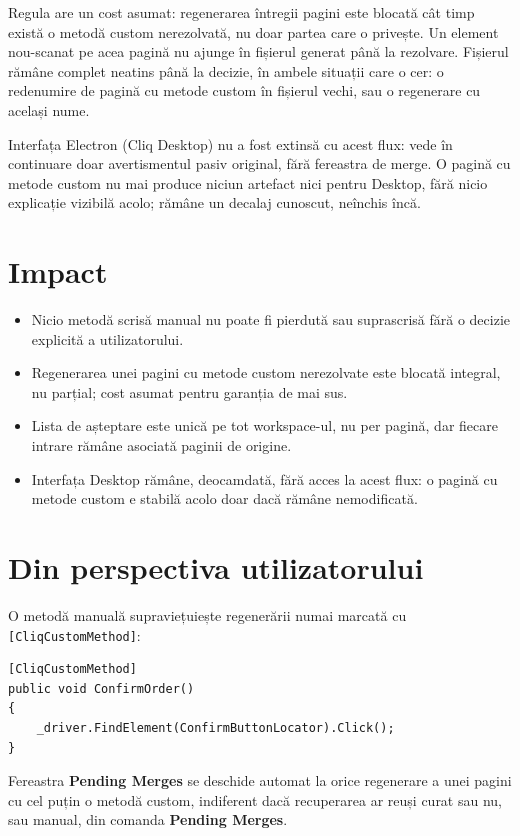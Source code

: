 \documentclass[12pt,a4paper]{report}
\newcommand{\UI}[1]{\textbf{#1}}
\newcommand{\File}[1]{\nolinkurl{#1}}
\begin{document}
Regula are un cost asumat: regenerarea întregii pagini este blocată cât timp există o metodă custom nerezolvată, nu doar partea care o privește. Un element nou-scanat pe acea pagină nu ajunge în fișierul generat până la rezolvare. Fișierul rămâne complet neatins până la decizie, în ambele situații care o cer: o redenumire de pagină cu metode custom în fișierul vechi, sau o regenerare cu același nume.

Interfața Electron (Cliq Desktop) nu a fost extinsă cu acest flux: vede în continuare doar avertismentul pasiv original, fără fereastra de merge. O pagină cu metode custom nu mai produce niciun artefact nici pentru Desktop, fără nicio explicație vizibilă acolo; rămâne un decalaj cunoscut, neînchis încă.

\section{Impact}

\begin{itemize}
  \item Nicio metodă scrisă manual nu poate fi pierdută sau suprascrisă fără o decizie explicită a utilizatorului.
  \item Regenerarea unei pagini cu metode custom nerezolvate este blocată integral, nu parțial; cost asumat pentru garanția de mai sus.
  \item Lista de așteptare este unică pe tot workspace-ul, nu per pagină, dar fiecare intrare rămâne asociată paginii de origine.
  \item Interfața Desktop rămâne, deocamdată, fără acces la acest flux: o pagină cu metode custom e stabilă acolo doar dacă rămâne nemodificată.
\end{itemize}

\section{Din perspectiva utilizatorului}

O metodă manuală supraviețuiește regenerării numai marcată cu \File{[CliqCustomMethod]}:

\begin{lstlisting}[language={[Sharp]C}]
[CliqCustomMethod]
public void ConfirmOrder()
{
    _driver.FindElement(ConfirmButtonLocator).Click();
}
\end{lstlisting}

Fereastra \UI{Pending Merges} se deschide automat la orice regenerare a unei pagini cu cel puțin o metodă custom, indiferent dacă recuperarea ar reuși curat sau nu, sau manual, din comanda \UI{Pending Merges}.
\end{document}
